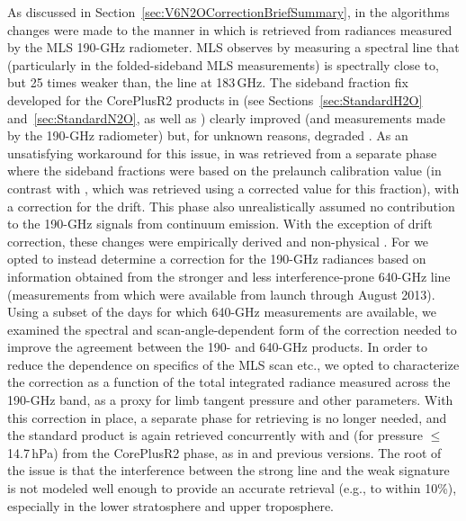 As discussed in Section~\ref{sec:V6N2OCorrectionBriefSummary}, in the \thisv algorithms changes were made to the manner in which  is retrieved from radiances measured by the MLS 190\nobreakdash-GHz radiometer.  MLS observes  by measuring a spectral line that (particularly in the folded-sideband MLS measurements) is spectrally close to, but 25 times weaker than, the  line at 183\,GHz. The sideband fraction fix developed for the CorePlusR2 products in \prevv (see Sections~\ref{sec:StandardH2O} and~\ref{sec:StandardN2O}, as well as \citet{LiveseyEtal:2021:Drifts}) clearly improved  (and  measurements made by the 190\nobreakdash-GHz radiometer) but, for unknown reasons, degraded . As an unsatisfying workaround for this issue,  in \prevv was retrieved from a separate phase where the sideband fractions were based on the prelaunch calibration value (in contrast with , which was retrieved using a corrected value for this fraction), with a correction for the drift. This phase also unrealistically assumed no contribution to the 190\nobreakdash-GHz signals from continuum emission.  With the exception of drift correction, these changes were empirically derived and non-physical \citep{LiveseyEtal:2021:Drifts}.  For \thisv {} we opted to instead determine a correction for the 190\nobreakdash-GHz radiances based on  information obtained from the stronger and less interference-prone 640\nobreakdash-GHz line (measurements from which were available from launch through August 2013). Using a subset of the days for which 640\nobreakdash-GHz  measurements are available, we examined the spectral and scan-angle-dependent form of the correction needed to improve the agreement between the 190- and 640\nobreakdash-GHz  products.  In order to reduce the dependence on specifics of the MLS scan etc., we opted to characterize the correction as a function of the total integrated radiance measured across the 190\nobreakdash-GHz band, as a proxy for limb tangent pressure and other parameters.  With this correction in place, a separate phase for retrieving  is no longer needed, and the standard  product is again retrieved concurrently with  and  (for pressure $\le$ 14.7\,hPa) from the CorePlusR2 phase, as in \viv and previous versions. The root of the issue is that the interference between the strong  line and the weak  signature is not modeled well enough to provide an accurate  retrieval (e.g., to within 10\%), especially in the lower stratosphere and upper troposphere.